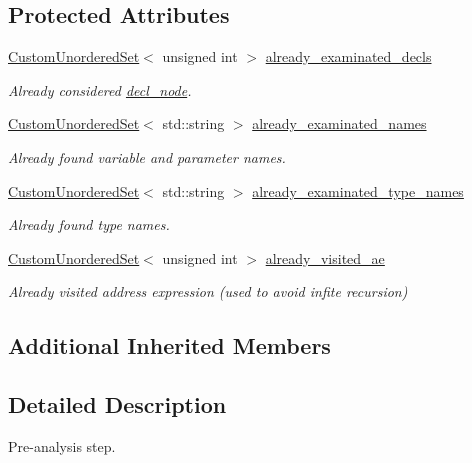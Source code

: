 \subsection*{Protected Attributes}
\begin{DoxyCompactItemize}
\item 
\hyperlink{classCustomUnorderedSet}{Custom\+Unordered\+Set}$<$ unsigned int $>$ \hyperlink{classVarDeclFix_a38ff6b42820b7feb6218edd5a031d473}{already\+\_\+examinated\+\_\+decls}
\begin{DoxyCompactList}\small\item\em Already considered \hyperlink{structdecl__node}{decl\+\_\+node}. \end{DoxyCompactList}\item 
\hyperlink{classCustomUnorderedSet}{Custom\+Unordered\+Set}$<$ std\+::string $>$ \hyperlink{classVarDeclFix_aa2aa0bb5e898f1c86710d3b6e65c430d}{already\+\_\+examinated\+\_\+names}
\begin{DoxyCompactList}\small\item\em Already found variable and parameter names. \end{DoxyCompactList}\item 
\hyperlink{classCustomUnorderedSet}{Custom\+Unordered\+Set}$<$ std\+::string $>$ \hyperlink{classVarDeclFix_a2b661a70923003acd493dc63b428898f}{already\+\_\+examinated\+\_\+type\+\_\+names}
\begin{DoxyCompactList}\small\item\em Already found type names. \end{DoxyCompactList}\item 
\hyperlink{classCustomUnorderedSet}{Custom\+Unordered\+Set}$<$ unsigned int $>$ \hyperlink{classVarDeclFix_a17a0e73aeb82b6490d4654ecc3b28f5e}{already\+\_\+visited\+\_\+ae}
\begin{DoxyCompactList}\small\item\em Already visited address expression (used to avoid infite recursion) \end{DoxyCompactList}\end{DoxyCompactItemize}
\subsection*{Additional Inherited Members}


\subsection{Detailed Description}
Pre-\/analysis step. 

